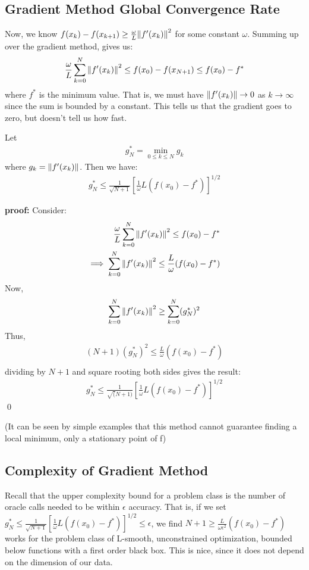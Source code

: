 \documentclass[12pt,a4paper]{article}
\begin{document}
	\subsection*{Gradient Method Global Convergence Rate}\label{gradGlobConvRate}
	Now, we know $f(x_k) - f(x_{k+1}) \geq \frac{\omega}{L}\norm{f'(x_k)}^2$ for some constant $\omega$. Summing up over the gradient method, gives us:
	\begin{align*}
		\frac{\omega}{L}\sum_{k=0}^{N}\norm{f'(x_k)}^2 \leq f(x_0) - f(x_{N+1}) \leq f(x_0) - f^*
	\end{align*}
	where $f^*$ is the minimum value. That is, we must have $\norm{f'(x_k)} \rightarrow 0$ as $k \rightarrow \infty$ since the sum is bounded by a constant. This tells us that the gradient goes to zero, but doesn't tell us how fast. 
	
	Let 
	\begin{align*}
		g_N^* = \min_{0 \leq k \leq N}g_k
	\end{align*}
	where $g_k = \norm{f'(x_k)}$. Then we have:
	\begin{align*}
		g_N^* \leq \frac{1}{\sqrt{N+1}}[\frac{1}{\omega}L(f(x_0) - f^*)]^{1/2}
	\end{align*}
	
	\textbf{proof:} Consider:
	\begin{align*}
		\frac{\omega}{L}\sum_{k=0}^{N}\norm{f'(x_k)}^2 \leq f(x_0) - f^* \\
		\implies \sum_{k=0}^{N}\norm{f'(x_k)}^2 \leq \frac{L}{\omega}(f(x_0) - f^*)
	\end{align*}	
	Now, 
	\begin{align*}
		\sum_{k=0}^{N}\norm{f'(x_k)}^2 \geq \sum_{k=0}^{N} (g_N^*)^2
	\end{align*}
	Thus,
	\begin{align*}
		(N+1)(g_N^*)^2 \leq \frac{L}{\omega}(f(x_0) - f^*) \\
	\end{align*}
	dividing by $N+1$ and square rooting both sides gives the result:
	\begin{align*}
		g_N^* \leq \frac{1}{\sqrt(N+1)}[\frac{1}{\omega}L(f(x_0) - f^*)]^{1/2}
	\end{align*}
	\qed
	
	(It can be seen by simple examples that this method cannot guarantee finding a local minimum, only a stationary point of f)
	
	\subsection*{Complexity of Gradient Method}\label{gradcomplex}
	Recall that the upper complexity bound for a problem class is the number of oracle calls needed to be within $\epsilon$ accuracy. That is, if we set $g_N^* \leq \frac{1}{\sqrt{N+1}}[\frac{1}{\omega}L(f(x_0) - f^*)]^{1/2} \leq \epsilon$, we find $N+1 \geq \frac{L}{\omega \epsilon^2}(f(x_0) - f^*)$ works for the problem class of L-smooth, unconstrained optimization, bounded below functions with a first order black box. This is nice, since it does not depend on the dimension of our data.
	
\end{document}
